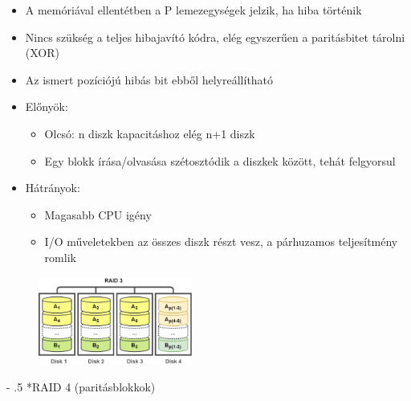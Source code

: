 \documentclass[tikz,12pt,margin=0px]{article}
\makeatletter
\renewcommand\paragraph{%
	\@startsection{paragraph}{4}{0mm}%
	{-\baselineskip}%
	{.5\baselineskip}%
	{\normalfont\normalsize\bfseries}}
\makeatother
\begin{document}
    \begin{itemize}[topsep=8pt,itemsep=4pt,partopsep=4pt, parsep=4pt]
        \item A memóriával ellentétben a P lemezegységek jelzik, ha hiba történik
        \item Nincs szükség a teljes hibajavító kódra, elég egyszerűen a paritásbitet tárolni (XOR)
        \item Az ismert pozíciójú hibás bit ebből helyreállítható
        \item Előnyök:
        \begin{itemize}
            \item Olcsó: n diszk kapacitáshoz elég n+1 diszk
            \item Egy blokk írása/olvasása szétosztódik a diszkek között, tehát felgyorsul
        \end{itemize}
        \item Hátrányok:
        \begin{itemize}
            \item Magasabb CPU igény
            \item I/O műveletekben az összes diszk részt vesz, a párhuzamos teljesítmény romlik
        \end{itemize}
    \end{itemize}
    \begin{figure}[H]
        \centering
        \includegraphics[width=0.45\textwidth]{img/raid3.png}
        \label{ref:raid3}
    \end{figure}

	\paragraph*{RAID 4 (paritásblokkok)}
\end{document}
